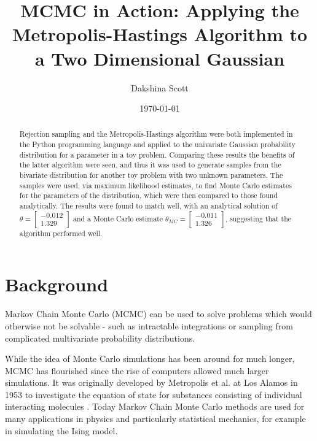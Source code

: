 \documentclass[a4paper,11pt,twoside]{article}
\begin{document}
 
\title{MCMC in Action: Applying the Metropolis-Hastings Algorithm to a Two
Dimensional Gaussian}

\date{\today} 
\author{Dakshina Scott} 
\maketitle

\begin{abstract} 
Rejection sampling and the Metropolis-Hastings algorithm were both
implemented in the Python programming language and applied to the univariate
Gaussian probability distribution for a parameter in a toy problem. Comparing
these results the benefits of the latter algorithm were seen, and thus it was
used to generate samples from the bivariate distribution for another toy
problem with two unknown parameters.
The samples were used, via maximum likelihood estimates, to find
Monte Carlo estimates for the parameters of the distribution, which were then
compared to those found analytically. The results were found to match well, with an
analytical solution of 
$\theta = \begin{bmatrix} 
		-0.012 \\ 
	1.329 \end{bmatrix}$ and a Monte Carlo estimate $\theta_{MC} = \begin{bmatrix} 
		-0.011 \\ 
	1.326 \end{bmatrix}$, suggesting that the algorithm performed well.  

\end{abstract}

\tableofcontents

\section{Background} 
Markov Chain Monte Carlo (MCMC) can be used to solve problems which would
otherwise not be solvable - such as intractable integrations or sampling from
complicated multivariate probability distributions.  

While the idea of Monte Carlo simulations has been
around for much longer, MCMC has flourished since the rise of computers allowed
much larger simulations. It was originally developed by Metropolis et al. at Los Alamos in
1953 to investigate the equation of state for substances consisting of
individual interacting molecules \cite{metropolis}. Today Markov Chain Monte
Carlo methods are used for many applications in physics and particularly statistical
mechanics, for example in simulating the Ising model\cite{statphys}.
\end{document}

